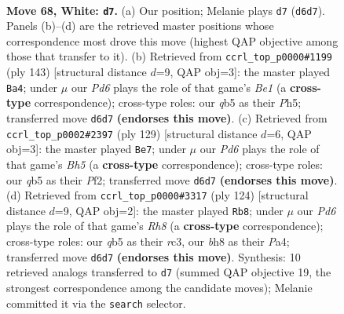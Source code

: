\documentclass[11pt]{article}
\begin{document}
\clearpage

\begin{figure}[p]\centering
\begin{subfigure}{0.46\textwidth}\centering
\resizebox{\linewidth}{!}{%
\newchessgame
\chessboard[
  setfen={7b/5p2/3P1k2/1q6/8/7K/8/8 w - - 5 68},
  showmover=false,
  pgfstyle=straightmove, color=movearrow, markmove={d6-d7}
]}
\caption{}
\end{subfigure}\hfill
\begin{subfigure}{0.46\textwidth}\centering
\resizebox{\linewidth}{!}{%
\newchessgame
\chessboard[
  setfen={4b3/7k/5K2/5P1p/7B/8/8/8 b - - 0 72},
  showmover=false,
  pgfstyle=straightmove, color=movearrow, markmove={e8-a4}
]}
\caption{}
\end{subfigure}
\\[4pt]
\begin{subfigure}{0.46\textwidth}\centering
\resizebox{\linewidth}{!}{%
\newchessgame
\chessboard[
  setfen={8/3k4/8/1K6/1P5b/3B4/5p2/8 b - - 0 65},
  showmover=false,
  pgfstyle=straightmove, color=movearrow, markmove={h4-e7}
]}
\caption{}
\end{subfigure}\hfill
\begin{subfigure}{0.46\textwidth}\centering
\resizebox{\linewidth}{!}{%
\newchessgame
\chessboard[
  setfen={7R/8/8/5p2/P4k2/2r5/8/4K3 w - - 10 63},
  showmover=false,
  pgfstyle=straightmove, color=movearrow, markmove={h8-b8}
]}
\caption{}
\end{subfigure}
\caption{\textbf{Move 68, White: \texttt{d7}.} (a) Our position; Melanie plays \texttt{d7} (\texttt{d6d7}). Panels (b)--(d) are the retrieved master positions whose correspondence most drove this move (highest QAP objective among those that transfer to it). (b) Retrieved from \texttt{ccrl\_top\_p0000\#1199} (ply 143) [structural distance $d$=9, QAP obj=3]: the master played \texttt{Ba4}; under $\mu$ our \emph{Pd6} plays the role of that game's \emph{Be1} (a \textbf{cross-type} correspondence); cross-type roles: our \emph{q}b5 as their \emph{P}h5; transferred move \texttt{d6d7} \textbf{(endorses this move)}. (c) Retrieved from \texttt{ccrl\_top\_p0002\#2397} (ply 129) [structural distance $d$=6, QAP obj=3]: the master played \texttt{Be7}; under $\mu$ our \emph{Pd6} plays the role of that game's \emph{Bh5} (a \textbf{cross-type} correspondence); cross-type roles: our \emph{q}b5 as their \emph{P}f2; transferred move \texttt{d6d7} \textbf{(endorses this move)}. (d) Retrieved from \texttt{ccrl\_top\_p0000\#3317} (ply 124) [structural distance $d$=9, QAP obj=2]: the master played \texttt{Rb8}; under $\mu$ our \emph{Pd6} plays the role of that game's \emph{Rh8} (a \textbf{cross-type} correspondence); cross-type roles: our \emph{q}b5 as their \emph{r}c3, our \emph{b}h8 as their \emph{P}a4; transferred move \texttt{d6d7} \textbf{(endorses this move)}. Synthesis: 10 retrieved analogs transferred to \texttt{d7} (summed QAP objective 19, the strongest correspondence among the candidate moves); Melanie committed it via the \texttt{search} selector.}
\label{fig:thought-m134}
\end{figure}
\end{document}
